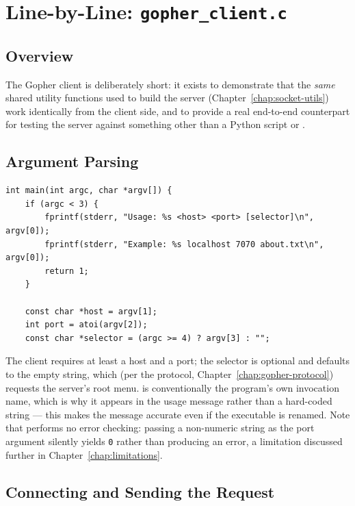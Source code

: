 \chapter{Line-by-Line: \texttt{gopher\_client.c}}
\label{chap:gopher-client}

\section{Overview}

The Gopher client is deliberately short: it exists to demonstrate that the \emph{same} shared utility functions used to build the server (Chapter~\ref{chap:socket-utils}) work identically from the client side, and to provide a real end-to-end counterpart for testing the server against something other than a Python script or .

\section{Argument Parsing}

\begin{lstlisting}[style=cstyle]
int main(int argc, char *argv[]) {
    if (argc < 3) {
        fprintf(stderr, "Usage: %s <host> <port> [selector]\n", argv[0]);
        fprintf(stderr, "Example: %s localhost 7070 about.txt\n", argv[0]);
        return 1;
    }

    const char *host = argv[1];
    int port = atoi(argv[2]);
    const char *selector = (argc >= 4) ? argv[3] : "";
\end{lstlisting}

The client requires at least a host and a port; the selector is optional and defaults to the empty string, which (per the protocol, Chapter~\ref{chap:gopher-protocol}) requests the server's root menu.  is conventionally the program's own invocation name, which is why it appears in the usage message rather than a hard-coded string --- this makes the message accurate even if the executable is renamed. Note that  performs no error checking: passing a non-numeric string as the port argument silently yields \texttt{0} rather than producing an error, a limitation discussed further in Chapter~\ref{chap:limitations}.

\section{Connecting and Sending the Request}

